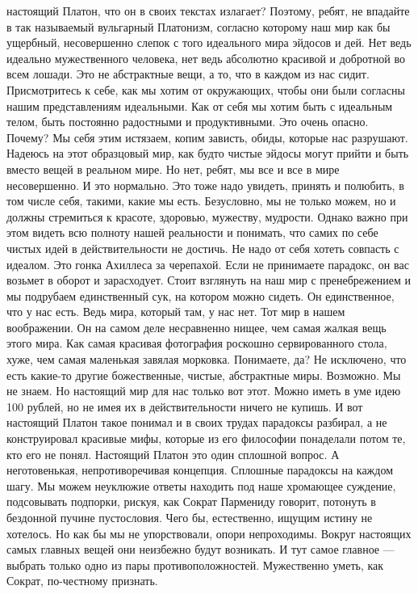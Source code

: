 настоящий Платон, что он в своих текстах излагает? Поэтому, ребят, не впадайте в
так называемый вульгарный Платонизм, согласно которому наш мир как бы ущербный,
несовершенно слепок с того идеального мира эйдосов и дей. Нет ведь идеально
мужественного человека, нет ведь абсолютно красивой и добротной во всем лошади.
Это не абстрактные вещи, а то, что в каждом из нас сидит. Присмотритесь к себе,
как мы хотим от окружающих, чтобы они были согласны нашим представлениям
идеальными. Как от себя мы хотим быть с идеальным телом, быть постоянно
радостными и продуктивными. Это очень опасно. Почему? Мы себя этим истязаем,
копим зависть, обиды, которые нас разрушают. Надеюсь на этот образцовый мир, как
будто чистые эйдосы могут прийти и быть вместо вещей в реальном мире. Но нет,
ребят, мы все и все в мире несовершенно. И это нормально. Это тоже надо увидеть,
принять и полюбить, в том числе себя, такими, какие мы есть. Безусловно, мы не
только можем, но и должны стремиться к красоте, здоровью, мужеству, мудрости.
Однако важно при этом видеть всю полноту нашей реальности и понимать, что самих
по себе чистых идей в действительности не достичь. Не надо от себя хотеть
совпасть с идеалом. Это гонка Ахиллеса за черепахой. Если не принимаете
парадокс, он вас возьмет в оборот и зарасходует. Стоит взглянуть на наш мир с
пренебрежением и мы подрубаем единственный сук, на котором можно сидеть. Он
единственное, что у нас есть. Ведь мира, который там, у нас нет. Тот мир в нашем
воображении. Он на самом деле несравненно нищее, чем самая жалкая вещь этого
мира. Как самая красивая фотография роскошно сервированного стола, хуже, чем
самая маленькая завялая морковка. Понимаете, да? Не исключено, что есть какие-то
другие божественные, чистые, абстрактные миры. Возможно. Мы не знаем. Но
настоящий мир для нас только вот этот. Можно иметь в уме идею 100 рублей, но не
имея их в действительности ничего не купишь. И вот настоящий Платон такое
понимал и в своих трудах парадоксы разбирал, а не конструировал красивые мифы,
которые из его философии понаделали потом те, кто его не понял. Настоящий Платон
это один сплошной вопрос. А неготовенькая, непротиворечивая концепция. Сплошные
парадоксы на каждом шагу. Мы можем неуклюжие ответы находить под наше хромающее
суждение, подсовывать подпорки, рискуя, как Сократ Пармениду говорит, потонуть в
бездонной пучине пустословия. Чего бы, естественно, ищущим истину не хотелось.
Но как бы мы не упорствовали, опори непроходимы. Вокруг настоящих самых главных
вещей они неизбежно будут возникать. И тут самое главное — выбрать только одно
из пары противоположностей. Мужественно уметь, как Сократ, по-честному признать.
